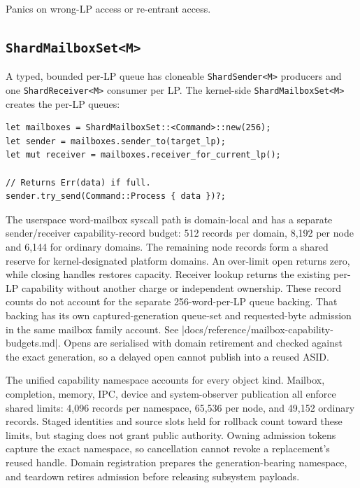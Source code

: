 Panics on wrong-LP access or re-entrant access.

\subsection{\texttt{ShardMailboxSet<M>}}

A typed, bounded per-LP queue has cloneable \texttt{ShardSender<M>} producers and
one \texttt{ShardReceiver<M>} consumer per LP. The kernel-side
\texttt{ShardMailboxSet<M>} creates the per-LP queues:

\begin{lstlisting}[style=rustCode]
let mailboxes = ShardMailboxSet::<Command>::new(256);
let sender = mailboxes.sender_to(target_lp);
let mut receiver = mailboxes.receiver_for_current_lp();

// Returns Err(data) if full.
sender.try_send(Command::Process { data })?;
\end{lstlisting}

The userspace word-mailbox syscall path is domain-local and has a separate
sender/receiver capability-record budget: 512 records per domain, 8,192 per
node and 6,144 for ordinary domains. The remaining node records form a shared
reserve for kernel-designated platform domains. An over-limit open returns
zero, while closing handles restores capacity. Receiver lookup returns the existing
per-LP capability without another charge or independent ownership. These
record counts do not account for the separate 256-word-per-LP queue backing.
That backing has its own captured-generation queue-set and requested-byte
admission in the same mailbox family account. See
\repofile|docs/reference/mailbox-capability-budgets.md|.
Opens are serialised with domain retirement and checked against the exact
generation, so a delayed open cannot publish into a reused ASID.

The unified capability namespace accounts for every object kind. Mailbox,
completion, memory, IPC, device and system-observer publication all enforce
shared limits:
4,096 records per namespace, 65,536 per node, and 49,152 ordinary records.
Staged identities and source slots held for rollback count toward these limits, but
staging does not grant public authority. Owning admission tokens capture the
exact namespace, so cancellation cannot revoke a replacement's reused handle.
Domain registration prepares the generation-bearing namespace, and teardown
retires admission before releasing subsystem payloads.

